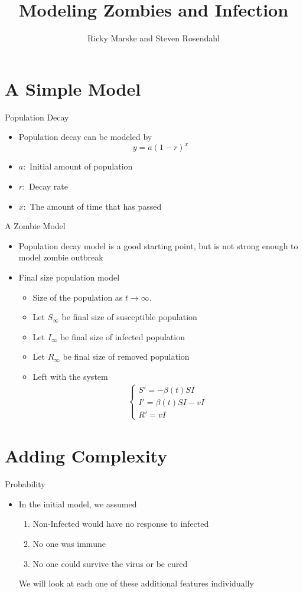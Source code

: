 \documentclass{beamer}
\title{Modeling Zombies and Infection}
\author{Ricky Marske and Steven Rosendahl}
\date{}
\begin{document}
\frame{\titlepage}

\section{A Simple Model}

\begin{frame}{Population Decay}
\begin{itemize}
\item Population decay can be modeled by
\[y=a(1-r)^{x}\]
\pause
\item $a:$ Initial amount of population
\pause
\item $r:$ Decay rate
\pause
\item $x:$ The amount of time that has passed
\end{itemize}
\end{frame}

\begin{frame}{A Zombie Model}
\begin{itemize}
\item Population decay model is a good starting point, but is not strong enough to model zombie
outbreak
\pause
\item Final size population model
\pause
\begin{itemize}
\item Size of the population as $t\to\infty$.
\pause
\item Let $S_{\infty}$ be final size of susceptible population
\pause
\item Let $I_{\infty}$ be final size of infected population
\pause
\item Let $R_{\infty}$ be final size of removed population
\pause
\item Left with the system
\begin{gather*}
\begin{cases}
S'=-\beta(t)SI\\
I'=\beta(t)SI-vI\\
R'=vI
\end{cases}
\end{gather*}
\end{itemize}
\end{itemize}
\end{frame}

\section{Adding Complexity}

\begin{frame}{Probability}
\begin{itemize}
\item In the initial model, we assumed
\pause
\begin{enumerate}
\item Non-Infected would have no response to infected
\pause
\item No one was immune
\pause
\item No one could survive the virus or be cured
\end{enumerate}
\pause We will look at each one of these additional features individually
\end{itemize}
\end{frame}
\end{document}
